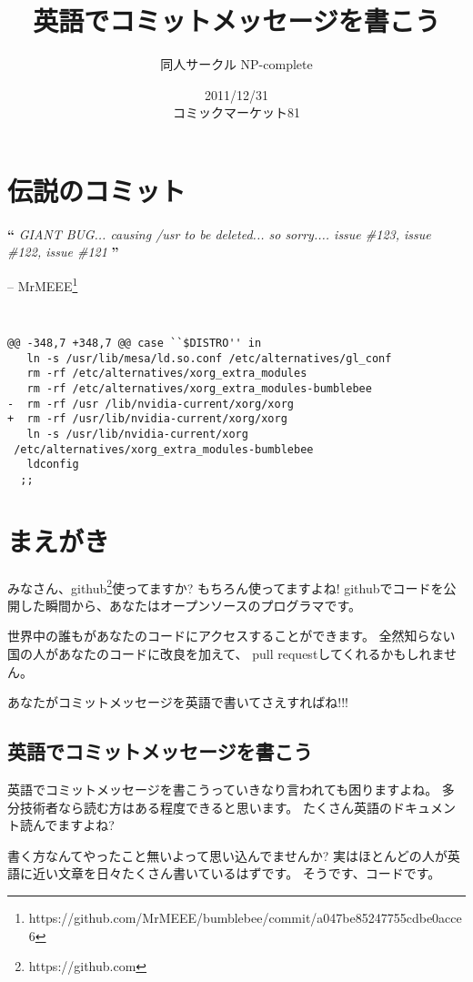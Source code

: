 \documentclass{jarticle}
\title{英語でコミットメッセージを書こう}
\author{同人サークル NP-complete}
\date{2011/12/31\\コミックマーケット81}
\begin{document}
\Huge
\maketitle
\normalsize
\thispagestyle{empty}
\newpage
\thispagestyle{empty}
\-
\newpage
\section*{伝説のコミット}
{\bf {\Large ``} }
{\it GIANT BUG... causing /usr to be deleted... so sorry....
 issue \#123, issue \#122, issue \#121}
{\bf {\Large ''} }
\begin{flushright}
 -- MrMEEE\footnote{https://github.com/MrMEEE/bumblebee/commit/a047be85247755cdbe0acce6}
\end{flushright}

\vspace{1in}

{\tt
\begin{verbatim}
@@ -348,7 +348,7 @@ case ``$DISTRO'' in
   ln -s /usr/lib/mesa/ld.so.conf /etc/alternatives/gl_conf
   rm -rf /etc/alternatives/xorg_extra_modules
   rm -rf /etc/alternatives/xorg_extra_modules-bumblebee
-  rm -rf /usr /lib/nvidia-current/xorg/xorg
+  rm -rf /usr/lib/nvidia-current/xorg/xorg
   ln -s /usr/lib/nvidia-current/xorg
 /etc/alternatives/xorg_extra_modules-bumblebee
   ldconfig
  ;;

\end{verbatim}
}

\newpage
\section{まえがき}
みなさん、github\footnote{https://github.com}使ってますか?
もちろん使ってますよね!
githubでコードを公開した瞬間から、あなたはオープンソースのプログラマです。

世界中の誰もがあなたのコードにアクセスすることができます。
全然知らない国の人があなたのコードに改良を加えて、
pull requestしてくれるかもしれません。

あなたがコミットメッセージを英語で書いてさえすればね!!!

\subsection{英語でコミットメッセージを書こう}
英語でコミットメッセージを書こうっていきなり言われても困りますよね。
多分技術者なら読む方はある程度できると思います。
たくさん英語のドキュメント読んでますよね?

書く方なんてやったこと無いよって思い込んでませんか?
実はほとんどの人が英語に近い文章を日々たくさん書いているはずです。
そうです、コードです。
\end{document}
